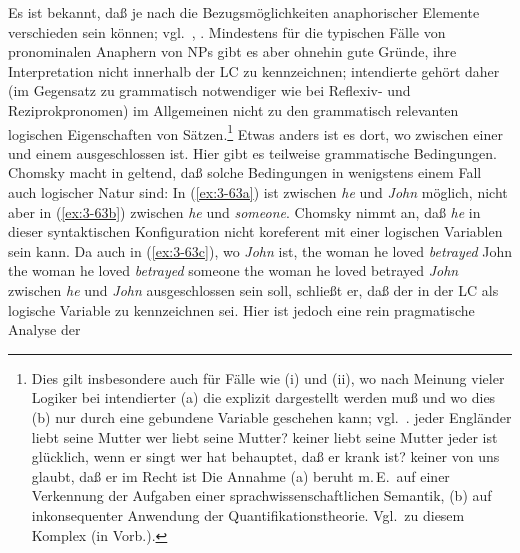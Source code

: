 \documentclass[output=paper]{langsci/langscibook}
\begin{document}
\addlines[2]
Es ist bekannt, daß je nach  die Bezugsmöglichkeiten
anaphorischer Elemente verschieden sein können; vgl.\ \zb \citet{Akmajian70}, \citet{AkmaJack70}. Mindestens für die typischen Fälle von pronominalen Anaphern von NPs gibt es aber ohnehin
gute Gründe, ihre Interpretation nicht innerhalb der LC zu kennzeichnen; intendierte  gehört daher (im Gegensatz zu grammatisch notwendiger  wie bei Reflexiv- und
Reziprokpronomen) im Allgemeinen nicht zu den grammatisch relevanten logischen
Eigenschaften von Sätzen.\footnote{\label{fn:3-17}%
	Dies gilt insbesondere auch für Fälle wie (i) und (ii), wo nach Meinung vieler Logiker bei intendierter  (a) die 
  explizit dargestellt werden muß und wo dies (b) nur durch eine
  gebundene Variable geschehen kann; vgl.\ \zb \citet{Evans80}.
  \eal
  \label{ex:3-i1}
  \ex
  \label{ex:3-ia}
  jeder Engländer liebt seine Mutter
  \ex
  \label{ex:3-ib}
  wer liebt seine Mutter?
  \ex
  \label{ex:3-ic}
  keiner liebt seine Mutter
  \zlmid
  \eal
  \label{ex:3-ii1}
  \ex
  \label{ex:3-iia}
  jeder ist glücklich, wenn er singt
  \ex
  \label{ex:3-iib}
  wer hat behauptet, daß er krank ist?
  \ex
  \label{ex:3-iic}
  keiner von uns glaubt, daß er im Recht ist
  \zl
  Die Annahme (a) beruht m.\,E.\ auf einer Verkennung der Aufgaben einer
  sprachwissenschaftlichen Semantik, (b) auf inkonsequenter Anwendung
  der Quantifikationstheorie. Vgl.\ zu diesem Komplex \citeauthor{Hoehle79c} (in Vorb.).%
  } 
Etwas anders ist es dort, wo
 zwischen einer  und einem  ausgeschlossen
ist. Hier gibt es teilweise grammatische Bedingungen. Chomsky macht in
\citet[340--345]{Chomsky76b} geltend, daß solche Bedingungen in wenigstens einem Fall
auch logischer Natur sind: In (\ref{ex:3-63a}) ist  zwischen \textit{he} und
\textit{John} möglich, nicht aber in (\ref{ex:3-63b}) zwischen \textit{he} und \textit{someone}. Chomsky
nimmt an, daß \textit{he} in dieser syntaktischen Konfiguration nicht koreferent
mit einer logischen Variablen sein kann. Da auch in (\ref{ex:3-63c}), wo \textit{John}
 ist, 
\eal
\label{ex:3-63}
\ex
\label{ex:3-63a}
the woman he loved \textit{betrayed} John
\ex
\label{ex:3-63b}
the woman he loved \textit{betrayed} someone
\ex
\label{ex:3-63c}
the woman he loved betrayed \textit{John}
\zl
zwischen \textit{he} und \textit{John} ausgeschlossen sein soll,
schließt er, daß der  in der LC als logische Variable zu
kennzeichnen sei. Hier ist jedoch eine rein pragmatische Analyse der
\end{document}
